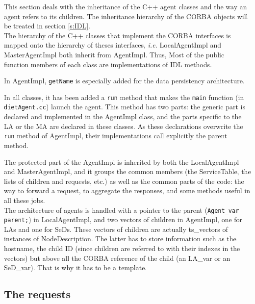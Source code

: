   This section deals with the inheritance of the C++ agent classes and the way an
  agent refers to its children. The inheritance hierarchy of the CORBA objects
  will be treated in section \ref{s:IDL}.
  \\

  The hierarchy of the C++ classes that implement the CORBA interfaces is mapped
  onto the hierarchy of theses interfaces, \emph{i.e.} \textsf{LocalAgentImpl} and
  \textsf{MasterAgentImpl} both inherit from \textsf{AgentImpl}. Thus, Most of the
  public function members of each class are implementations of IDL methods.

  In \textsf{AgentImpl}, \texttt{getName} is especially added for the data
  persistency architecture.

  In all classes, it has been added a \texttt{run} method that makes the
  \texttt{main} function (in \texttt{dietAgent.cc}) launch the agent. This method
  has two parts: the generic part is declared and implemented in the
  \textsf{AgentImpl} class, and the parts specific to the LA or the MA are
  declared in these classes. As these declarations overwrite the \texttt{run}
  method of \textsf{AgentImpl}, their implementations call explicitly the parent
  method.

  The protected part of the \textsf{AgentImpl} is inherited by both the
  \textsf{LocalAgentImpl} and \textsf{MasterAgentImpl}, and it groups the common
  members (the \textsf{ServiceTable}, the lists of children and requests, etc.) as
  well as the common parts of the code: the way to forward a request, to aggregate
  the responses, and some methods useful in all these jobs.
  \\

  The architecture of agents is handled with a pointer to the parent
  (\verb+Agent_var parent;+) in \textsf{LocalAgentImpl}, and two vectors of children
  in \textsf{AgentImpl}, one for LAs and one for SeDs. These vectors of children are
  actually \textsf{ts\_vectors} of instances of \textsf{NodeDescription}. The
  latter has to store information such as the hostname, the child ID (since
      children are referred to with their indexes in the vectors) but above all the
  CORBA reference of the child (an \textsf{LA\_var} or an \textsf{SeD\_var}). That
  is why it has to be a template.


  \subsection{The requests}

